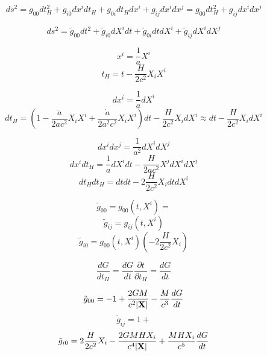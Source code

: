 \documentclass[12pt,a4paper]{article}
\begin{document}
$$ds^2 = g_{00}dt_H^2 + g_{i0}dx^idt_H + g_{0i}dt_Hdx^i + g_{ij}dx^idx^j = g_{00}dt_H^2 + g_{ij}dx^idx^j$$

$$ds^2 = \tilde g_{00}dt^2 + \tilde g_{i0}dX^idt + \tilde g_{0i}dtdX^i + \tilde g_{ij}dX^idX^j $$

$$x^i = \frac{1}{a}X^i$$
$$t_H = t - \frac{H}{2c^2}X_iX^i$$

$$dx^i = \frac{1}{a}dX^i$$
$$dt_H = (1 - \frac{\ddot a}{2ac^2}X_iX^i + \frac{\dot a}{2a^2c^2}X_iX^i)dt - \frac{H}{2c^2}X_idX^i \approx dt - \frac{H}{2c^2}X_idX^i$$

$$dx^idx^j = \frac{1}{a^2}dX^idX^j$$
$$dx^idt_H = \frac{1}{a}dX^idt - \frac{H}{2ac^2}X^jdX^idX^j$$
$$dt_Hdt_H = dtdt - 2\frac{H}{2c^2}X_idtdX^i$$

$$\tilde g_{00} = g_{00}(t, X^i) = $$
$$\tilde g_{ij} = g_{ij}(t, X^i)$$
$$\tilde g_{i0} = g_{00}(t, X^i)(-2\frac{H}{2c^2}X_i)$$

$$\frac{dG}{dt_H} = \frac{dG}{dt}\frac{\partial t}{\partial t_H} = \frac{dG}{dt}$$

$$\tilde g_{00} = -1 + \frac{2GM}{c^2|\bold{X}|} - \frac{M}{c^3}\frac{dG}{dt}$$
$$\tilde g_{ij} = 1 + $$
$$\tilde g_{i0} = 2\frac{H}{2c^2}X_i - \frac{2GMHX_i}{c^4|\bold{X}|} + \frac{MHX_i}{c^5}\frac{dG}{dt}$$
\end{document}
